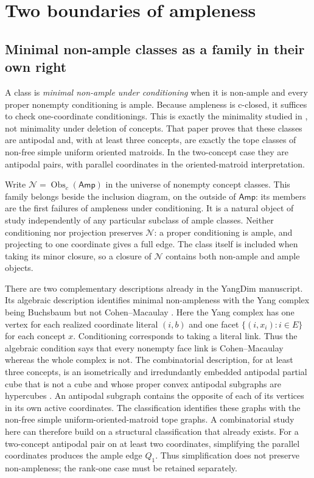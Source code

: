 \documentclass[11pt]{article}
\theoremstyle{definition}
\newcommand{\Amp}{\mathsf{Amp}}
\newcommand{\Obs}{\operatorname{Obs}}
\begin{document}
\section{Two boundaries of ampleness}\label{sec:obstructions}

\subsection{Minimal non-ample classes as a family in their own right}
\label{sec:minimal-nonample}

A class is \emph{minimal non-ample under conditioning} when it is non-ample
and every proper nonempty conditioning is ample. Because ampleness is
c-closed, it suffices to check one-coordinate conditionings. This is exactly
the minimality studied in \cite{MNA}, not minimality under deletion of concepts.
That paper proves that these classes are antipodal and, with at least three
concepts, are exactly the tope classes of non-free simple uniform oriented
matroids. In the two-concept case they are antipodal pairs, with parallel
coordinates in the oriented-matroid interpretation.

Write $\mathcal N=\Obs_c(\Amp)$ in the universe of nonempty concept
classes. This family belongs beside the inclusion diagram, on the outside
of $\Amp$: its members are the first failures of ampleness under
conditioning. It is a natural object of study independently of any
particular subclass of ample classes. Neither conditioning nor projection
preserves $\mathcal N$: a proper conditioning is ample, and projecting to
one coordinate gives a full edge. The class itself is included when taking
its minor closure, so a closure of $\mathcal N$ contains both non-ample and
ample objects.

There are two complementary descriptions already in the YangDim manuscript.
Its algebraic description identifies minimal non-ampleness with the Yang
complex being Buchsbaum but not Cohen--Macaulay
\cite[Theorem on the Buchsbaum characterization]{MNA}. Here the Yang complex
has one vertex for each realized coordinate literal $(i,b)$ and one facet
$\{(i,x_i):i\in E\}$ for each concept $x$. Conditioning corresponds to
taking a literal link. Thus the algebraic condition says that every nonempty
face link is Cohen--Macaulay whereas the whole complex is not.
The combinatorial description, for at least three concepts, is an
isometrically and irredundantly embedded antipodal partial cube that is not a cube and whose
proper convex antipodal
subgraphs are hypercubes \cite[Classification theorem]{MNA}. An antipodal
subgraph contains the opposite of each of its vertices in its own active
coordinates. The classification identifies these graphs with the non-free
simple uniform-oriented-matroid tope graphs. A combinatorial study here can
therefore build on a structural classification that already exists.
For a two-concept antipodal pair on at least two coordinates, simplifying
the parallel coordinates produces the ample edge $Q_1$. Thus simplification
does not preserve non-ampleness; the rank-one case must be retained separately.
\end{document}
